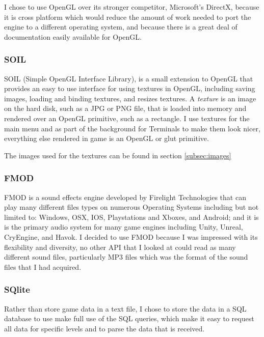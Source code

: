 \documentclass{article}
\begin{document}
I chose to use OpenGL over its stronger competitor, Microsoft's DirectX, because it is cross platform which would reduce the amount of work needed to port the engine to a different operating system, and because there is a great deal of documentation easily available for OpenGL.

\subsubsection{SOIL} \label{subsubsec:SOIL}

SOIL (Simple OpenGL Interface Library), is a small extension to OpenGL that provides an easy to use interface for using textures in OpenGL, including saving images, loading and binding textures, and resizes textures. A \emph{texture} is an image on the hard disk, such as a JPG or PNG file, that is loaded into memory and rendered over an OpenGL primitive, such as a rectangle. I use textures for the main menu and as part of the background for Terminals to make them look nicer, everything else rendered in game is an OpenGL or glut primitive.

The images used for the textures can be found in section \ref{subsec:images}

\subsubsection{FMOD} \label{subsubsec:FMOD}

FMOD is a sound effects engine developed by Firelight Technologies that can play many different files types on numerous Operating Systems including but not limited to: Windows, OSX, IOS, Playstations and Xboxes, and Android; and it is is the primary audio system for many game engines including Unity, Unreal, CryEngine, and Havok. I decided to use FMOD because I was impressed with its flexibility and diversity, no other API that I looked at could read as many different sound files, particularly MP3 files which was the format of the sound files that I had acquired.

\subsubsection{SQlite} \label{subsubsec:SQLite}

Rather than store game data in a text file, I chose to store the data in a SQL database to use make full use of the SQL queries, which make it easy to request all data for specific levels and to parse the data that is received. 
\end{document}
